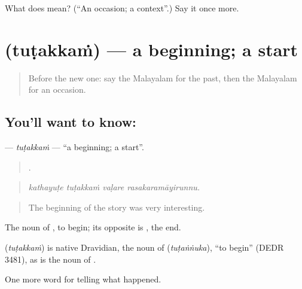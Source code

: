 \begin{tcolorbox}[breakable,colback=teal!4,colframe=teal!35!black,title={Before you move on}]
What does  mean? (\textquotedblleft{}An occasion; a context\textquotedblright{}.) Say it once more.
\end{tcolorbox}
\section[\texorpdfstring{\ml{തുടക്കം} (tuṭakkaṁ)}{തുടക്കം (tuṭakkaṁ)}]{ (tuṭakkaṁ) — a beginning; a start}

\label{lesson:ML-C361-tutakkam}



\begin{quote}
Before the new one: say the Malayalam for the past, then the Malayalam for an occasion.
\end{quote}

\subsection*{You'll want to know: }
\textbf{} — \emph{tuṭakkaṁ} — \textquotedblleft{}a beginning; a start\textquotedblright{}.

\begin{quote}
   .
\end{quote}

\begin{quote}
\emph{kathayuṭe tuṭakkaṁ vaḷare rasakaramāyirunnu.}
\end{quote}

\begin{quote}
The beginning of the story was very interesting.
\end{quote}

The noun of , to begin; its opposite is , the end.

\begin{cousinweb}
\textbf{} (\emph{tuṭakkaṁ}) is native Dravidian, the noun of  (\emph{tuṭaṅṅuka}), \textquotedblleft{}to begin\textquotedblright{} (DEDR 3481), as  is the noun of .
\end{cousinweb}

\begin{grammarlens}[title={What you've built}]
One more word for telling what happened.
\end{grammarlens}

